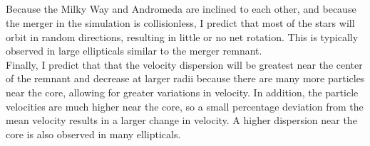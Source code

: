 \documentclass[linenumbers]{aastex63}
\begin{document}
\subsection{}

Because the Milky Way and Andromeda are inclined to each other, and because the merger in the simulation is collisionless, I predict that most of the stars will orbit in random directions, resulting in little or no net rotation. This is typically observed in large ellipticals similar to the merger remnant.\\

Finally, I predict that that the velocity dispersion will be greatest near the center of the remnant and decrease at larger radii because there are many more particles near the core, allowing for greater variations in velocity. In addition, the particle velocities are much higher near the core, so a small percentage deviation from the mean velocity results in a larger change in velocity. A higher dispersion near the core is also observed in many ellipticals.

{}

\end{document}
